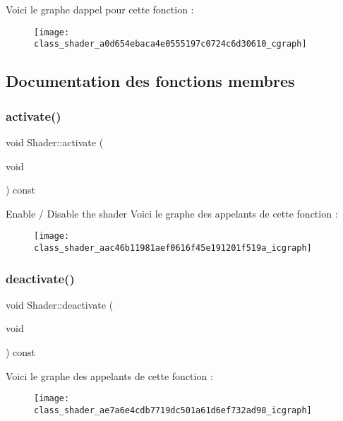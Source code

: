 Voici le graphe d\textquotesingle{}appel pour cette fonction \+:\nopagebreak
\begin{figure}[H]
\begin{center}
\leavevmode
\texttt{[image: class\_shader\_a0d654ebaca4e0555197c0724c6d30610\_cgraph]}
\end{center}
\end{figure}


\subsection{Documentation des fonctions membres}
\mbox{\label{class_shader_aac46b11981aef0616f45e191201f519a}} 
\subsubsection{\texorpdfstring{activate()}{activate()}}
{\footnotesize\ttfamily void Shader\+::activate (\begin{DoxyParamCaption}\item[{void}]{ }\end{DoxyParamCaption}) const}

Enable / Disable the shader Voici le graphe des appelants de cette fonction \+:\nopagebreak
\begin{figure}[H]
\begin{center}
\leavevmode
\texttt{[image: class\_shader\_aac46b11981aef0616f45e191201f519a\_icgraph]}
\end{center}
\end{figure}
\mbox{\label{class_shader_ae7a6e4cdb7719dc501a61d6ef732ad98}} 
\subsubsection{\texorpdfstring{deactivate()}{deactivate()}}
{\footnotesize\ttfamily void Shader\+::deactivate (\begin{DoxyParamCaption}\item[{void}]{ }\end{DoxyParamCaption}) const}

Voici le graphe des appelants de cette fonction \+:\nopagebreak
\begin{figure}[H]
\begin{center}
\leavevmode
\texttt{[image: class\_shader\_ae7a6e4cdb7719dc501a61d6ef732ad98\_icgraph]}
\end{center}
\end{figure}
\mbox{\label{class_shader_af4bd705b0eb25ec610dffb4b5d694641}} 
